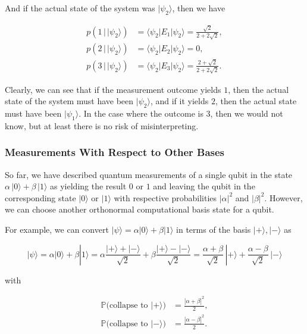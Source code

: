 \documentclass{article}
\theoremstyle{definition}
\begin{document}
      And if the actual state of the system was $|\psi_2 \rangle$, then we have

      \begin{align*}
        p(1 \,|\, |\psi_2 \rangle) & = \langle \psi_2 | E_1 | \psi_2 \rangle = \frac{\sqrt{2}}{2 + 2\sqrt{2}}, \\
        p(2 \,|\, |\psi_2 \rangle) & = \langle \psi_2 | E_2 | \psi_2 \rangle = 0, \\
        p(3 \,|\, |\psi_2 \rangle) & = \langle \psi_2 | E_3 | \psi_2 \rangle =  \frac{2 + \sqrt{2}}{2 + 2\sqrt{2}}.
      \end{align*}

      Clearly, we can see that if the measurement outcome yields $1$, then the actual state of the system must have been $|\psi_2\rangle$, and if it yields $2$, then the actual state must have been $|\psi_1 \rangle$. In the case where the outcome is $3$, then we would not know, but at least there is no risk of misinterpreting.

    \subsubsection{Measurements With Respect to Other Bases}

      So far, we have described quantum measurements of a single qubit in the state $\alpha\, |0\rangle + \beta \, |1 \rangle$ as yielding the result $0$ or $1$ and leaving the qubit in the corresponding state $|0\rangle$ or $|1\rangle$ with respective probabilities $|\alpha|^2$ and $|\beta|^2$. However, we can choose another orthonormal computational basis state for a qubit.

      For example, we can convert $|\psi \rangle = \alpha |0\rangle + \beta |1 \rangle$ in terms of the basis $|+\rangle, |-\rangle$ as

        \[|\psi \rangle = \alpha |0\rangle + \beta |1 \rangle = \alpha \frac{|+\rangle + |-\rangle}{\sqrt{2}} + \beta \frac{|+\rangle - |-\rangle}{\sqrt{2}} = \frac{\alpha + \beta}{\sqrt{2}} \, |+\rangle + \frac{\alpha - \beta}{\sqrt{2}} \, |-\rangle\]

      with

      \begin{align*}
        \mathbb{P} \big( \text{collapse to } |+\rangle \big) & = \frac{|\alpha + \beta|^2}{2}, \\
        \mathbb{P} \big( \text{collapse to } |-\rangle \big) & = \frac{|\alpha - \beta|^2}{2}.
      \end{align*}
\end{document}
